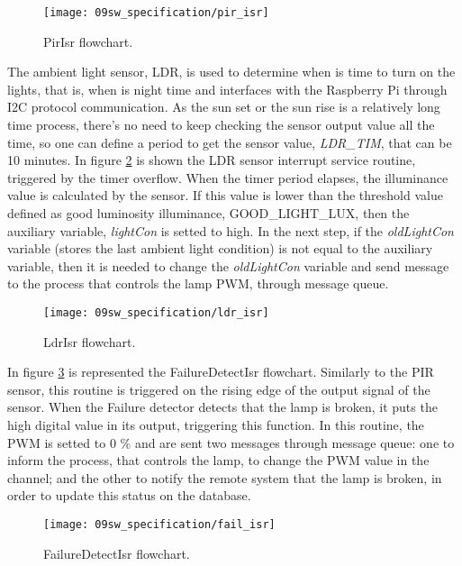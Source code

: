 \begin{figure}[H]
	\centering
	\texttt{[image: 09sw\_specification/pir\_isr]}
	\caption{PirIsr flowchart.}
	\label{fig:pir_isr}
\end{figure}

The ambient light sensor, LDR, is used to determine when is time to turn on the lights, that is, when is night time and interfaces with the Raspberry Pi through I2C protocol communication. As the sun set or the sun rise is a relatively long time process, there's no need to keep checking the sensor output value all the time, so one can define a period to get the sensor value, \textit{LDR\_TIM}, that can be 10 minutes. In figure \ref{fig:ldr_isr} is shown the LDR sensor interrupt service routine, triggered by the timer overflow. When the timer period elapses, the illuminance value is calculated by the sensor. If this value is lower than the threshold value defined as good luminosity illuminance, GOOD\_LIGHT\_LUX, then the auxiliary variable, \textit{lightCon} is setted to high. In the next step, if the \textit{oldLightCon} variable (stores the last ambient light condition) is not equal to the auxiliary variable, then it is needed to change the \textit{oldLightCon} variable and send message to the process that controls the lamp PWM, through message queue. 

\begin{figure}[H]
	\centering
	\texttt{[image: 09sw\_specification/ldr\_isr]}
	\caption{LdrIsr flowchart.}
	\label{fig:ldr_isr}
\end{figure}

In figure \ref{fig:fail_isr} is represented the FailureDetectIsr flowchart. Similarly to the PIR sensor, this routine is triggered on the rising edge of the output signal of the sensor. When the Failure detector detects that the lamp is broken, it puts the high digital value in its output, triggering this function. In this routine, the PWM is setted to 0 \% and are sent two messages through message queue: one to inform the process, that controls the lamp, to change the PWM value in the channel; and the other to notify the remote system that the lamp is broken, in order to update this status on the database.

\begin{figure}[H]
	\centering
	\texttt{[image: 09sw\_specification/fail\_isr]}
	\caption{FailureDetectIsr flowchart.}
	\label{fig:fail_isr}
\end{figure}

